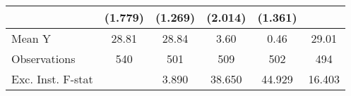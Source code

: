 {\begin{tabular}{l*{5}{c}}
            &     (1.779)         &     (1.269)         &     (2.014)         &     (1.361)         &                     \\
\midrule
Mean Y      &       28.81         &       28.84         &        3.60         &        0.46         &       29.01         \\
Observations&         540         &         501         &         509         &         502         &         494         \\
Exc. Inst. F-stat&                     &       3.890         &      38.650         &      44.929         &      16.403         \\
\bottomrule
\end{tabular}
}
